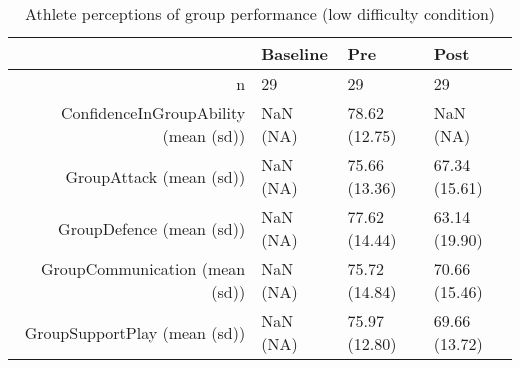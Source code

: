 \begin{table}[ht]
\centering
\begin{tabular}{rlll}
  \hline
 & Baseline & Pre & Post \\ 
  \hline
n &  29 &    29 &    29 \\ 
  ConfidenceInGroupAbility (mean (sd)) & NaN (NA) & 78.62 (12.75) &   NaN (NA) \\ 
  GroupAttack (mean (sd)) & NaN (NA) & 75.66 (13.36) & 67.34 (15.61) \\ 
  GroupDefence (mean (sd)) & NaN (NA) & 77.62 (14.44) & 63.14 (19.90) \\ 
  GroupCommunication (mean (sd)) & NaN (NA) & 75.72 (14.84) & 70.66 (15.46) \\ 
  GroupSupportPlay (mean (sd)) & NaN (NA) & 75.97 (12.80) & 69.66 (13.72) \\ 
   \hline
\end{tabular}
\caption{Athlete perceptions of 
 group performance (low difficulty condition)} 
\end{table}
